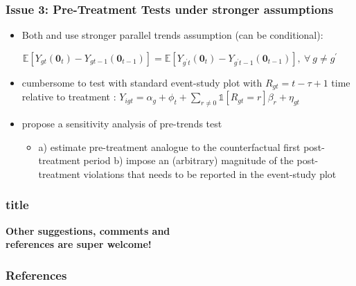 \documentclass{beamer}
\begin{document}
\begin{frame}\frametitle{Issue 3: Pre-Treatment Tests under stronger assumptions}
    
    \begin{itemize}
        \item Both \citet{bib:dechaisemartin2021} and \citet{bib:callaway2021} use stronger parallel trends assumption (can be conditional):
    \end{itemize}
    
    \begin{equation*}
        \mathbb{E}\left[Y_{gt}(\bm{0}_t) - Y_{gt-1}(\bm{0}_{t-1})\right] = \mathbb{E}\left[Y_{g^{\prime}t}(\bm{0}_t) - Y_{g^{\prime}t-1}(\bm{0}_{t-1})\right], \ \forall \ g \neq g^{\prime}
    \end{equation*}

    \begin{itemize}

        \item cumbersome to test with standard event-study plot with $R_{gt} = t - \tau + 1$ time relative to treatment : $Y_{igt} = \alpha_g + \phi_t + \sum_{r \neq 0} \mathds{1}\left[R_{gt} = r \right] \beta_r + \eta_{gt}$

         \item \citet{bib:rambachan2021} propose a sensitivity analysis of pre-trends test

         \begin{itemize}
             \item a) estimate pre-treatment analogue to the counterfactual first post-treatment period b) impose an (arbitrary) magnitude of the post-treatment violations that needs to be reported in the event-study plot  
         \end{itemize}

    \end{itemize}

\end{frame}

\begin{frame}\frametitle{title}
    
     \begin{center}
        \textbf{\LARGE Other suggestions, comments and \\ references are super welcome!}
     \end{center}

\end{frame}


\begin{frame}[allowframebreaks]
  \frametitle{References}
  
  
\end{frame}
\end{document}
